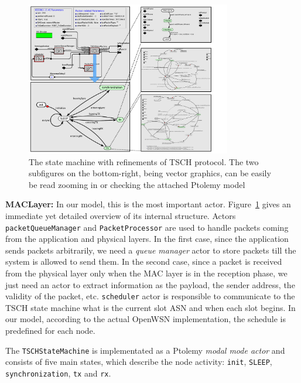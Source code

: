 \begin{figure}[t]
\centering
\includegraphics[width=0.8\textwidth]{figures/PaperTSCHStateMachine}
\caption{\small The state machine with refinements of TSCH protocol. The two subfigures on the bottom-right, being vector graphics, can be easily be read zooming in or checking the attached Ptolemy model}
\label{fig:TSCHSM}
\end{figure}

{\bf MACLayer:} In our model, this is the most important actor. Figure~\ref{fig:TSCHSM} gives an immediate yet detailed overview of its internal structure.
Actors \texttt{packetQueueManager} and \texttt{PacketProcessor} are used to handle packets coming from the application and physical layers. In the first case, since the application sends packets arbitrarily, we need a \emph{queue manager} actor to store packets till the system is allowed to send them. In the second case, since a packet is received from the physical layer only when the MAC layer is in the reception phase, we just need an actor to extract information as the payload, the sender address, the validity of the packet, etc.
\texttt{scheduler} actor is responsible to communicate to the TSCH state machine what is the current slot ASN and when each slot begins. In our model, according to the actual OpenWSN implementation, the schedule is predefined for each node. 

The \texttt{TSCHStateMachine} is implementated as a Ptolemy \emph{modal mode actor} and consists of five main states, which describe the node activity: \texttt{init}, \texttt{SLEEP}, \texttt{synchronization}, \texttt{tx} and \texttt{rx}. 

